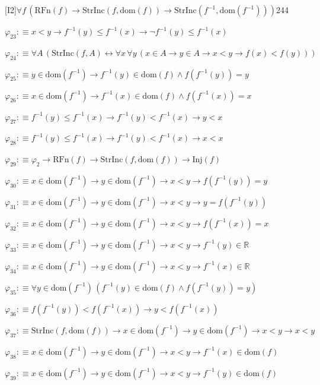 \begin{fullproof}{[I2]}{$\forall f\,(\mathrm{RFn}(f) \to \mathrm{StrInc}(f,\mathrm{dom}(f)) \to \mathrm{StrInc}(f^{-1},\mathrm{dom}(f^{-1})))$}{244}
\begin{abbrevlist}
\item $\varphi_{23} :\equiv x < y \to f^{-1}(y) \leq f^{-1}(x) \to \neg f^{-1}(y) \leq f^{-1}(x)$
\item $\varphi_{24} :\equiv \forall A\,(\mathrm{StrInc}(f,A) \leftrightarrow \forall x\,\forall y\,(x \in A \to y \in A \to x < y \to f(x) < f(y)))$
\item $\varphi_{25} :\equiv y \in \mathrm{dom}(f^{-1}) \to f^{-1}(y) \in \mathrm{dom}(f) \land f(f^{-1}(y)) = y$
\item $\varphi_{26} :\equiv x \in \mathrm{dom}(f^{-1}) \to f^{-1}(x) \in \mathrm{dom}(f) \land f(f^{-1}(x)) = x$
\item $\varphi_{27} :\equiv f^{-1}(y) \leq f^{-1}(x) \to f^{-1}(y) < f^{-1}(x) \to y < x$
\item $\varphi_{28} :\equiv f^{-1}(y) \leq f^{-1}(x) \to f^{-1}(y) < f^{-1}(x) \to x < x$
\item $\varphi_{29} :\equiv \varphi_{2} \to \mathrm{RFn}(f) \to \mathrm{StrInc}(f,\mathrm{dom}(f)) \to \mathrm{Inj}(f)$
\item $\varphi_{30} :\equiv x \in \mathrm{dom}(f^{-1}) \to y \in \mathrm{dom}(f^{-1}) \to x < y \to f(f^{-1}(y)) = y$
\item $\varphi_{31} :\equiv x \in \mathrm{dom}(f^{-1}) \to y \in \mathrm{dom}(f^{-1}) \to x < y \to y = f(f^{-1}(y))$
\item $\varphi_{32} :\equiv x \in \mathrm{dom}(f^{-1}) \to y \in \mathrm{dom}(f^{-1}) \to x < y \to f(f^{-1}(x)) = x$
\item $\varphi_{33} :\equiv x \in \mathrm{dom}(f^{-1}) \to y \in \mathrm{dom}(f^{-1}) \to x < y \to f^{-1}(y) \in \mathbb{R}$
\item $\varphi_{34} :\equiv x \in \mathrm{dom}(f^{-1}) \to y \in \mathrm{dom}(f^{-1}) \to x < y \to f^{-1}(x) \in \mathbb{R}$
\item $\varphi_{35} :\equiv \forall y \in \mathrm{dom}(f^{-1})\,(f^{-1}(y) \in \mathrm{dom}(f) \land f(f^{-1}(y)) = y)$
\item $\varphi_{36} :\equiv f(f^{-1}(y)) < f(f^{-1}(x)) \to y < f(f^{-1}(x))$
\item $\varphi_{37} :\equiv \mathrm{StrInc}(f,\mathrm{dom}(f)) \to x \in \mathrm{dom}(f^{-1}) \to y \in \mathrm{dom}(f^{-1}) \to x < y \to x < y$
\item $\varphi_{38} :\equiv x \in \mathrm{dom}(f^{-1}) \to y \in \mathrm{dom}(f^{-1}) \to x < y \to f^{-1}(x) \in \mathrm{dom}(f)$
\item $\varphi_{39} :\equiv x \in \mathrm{dom}(f^{-1}) \to y \in \mathrm{dom}(f^{-1}) \to x < y \to f^{-1}(y) \in \mathrm{dom}(f)$

\end{abbrevlist}
\end{fullproof}
